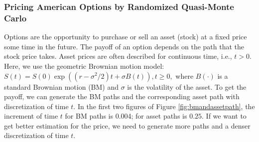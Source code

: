 \subsubsection{Pricing American Options by Randomized Quasi-Monte Carlo}
Options are the opportunity to purchase or sell an asset (stock) at a fixed price some time in the
future. 
The payoff of an option depends on the path that the stock price takes. 
Asset prices are often described for continuous time, i.e., $t > 0.$ Here, we use the geometric Brownian
motion model:
$S(t) = S(0) \exp((r - \sigma^2/2)t + \sigma B(t)), t \ge 0,$
where $B(\cdot )$ is a standard Brownian motion (BM) and $\sigma$ is the volatility of the asset. To get the payoff, we can generate the BM paths and the corresponding asset path with discretization of time $t$. In the first two figures of Figure \ref{fig:bmandassetpath}, the increment of time $t$ for BM paths is 0.004; for asset paths is $0.25$. If we want to get better estimation for the price, we need to generate more paths and a denser discretization of time $t$.

